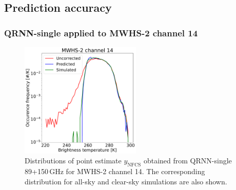 \documentclass[amt, manuscript]{copernicus}
\newcommand{\ynfcs}{y_\text{NFCS}}
\begin{document}
\subsection{Prediction accuracy}

\subsubsection{QRNN-single applied to MWHS-2 channel 14} 
\begin{figure}[t]
	\centering
	\includegraphics[height=55mm]{Figures/QRNN_output_mwhs.pdf} 
	\caption{Distributions of point estimate $\ynfcs$ obtained from QRNN-single 89+150\,GHz for MWHS-2 channel 14. The corresponding distribution for all-sky and clear-sky simulations are also shown.}
	\label{fig:distribution_predicted_mwhs14}	
\end{figure}
\end{document}
